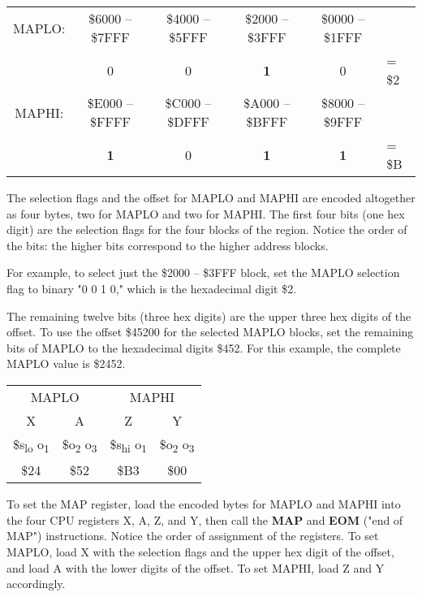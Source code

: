 \begin{center}
\begin{tabular}{c|c|c|c|c|l}
MAPLO: & \$6000 -- \$7FFF & \$4000 -- \$5FFF & \$2000 -- \$3FFF & \$0000 --
\$1FFF & \\
& 0 & 0 & {\bf 1} & 0 & = \$2 \\
\hline
MAPHI: & \$E000 -- \$FFFF & \$C000 -- \$DFFF & \$A000 -- \$BFFF & \$8000 --
\$9FFF & \\
& {\bf 1} & 0 & {\bf 1} & {\bf 1} & = \$B \\
\end{tabular}
\end{center}

The selection flags and the offset for MAPLO and MAPHI are encoded altogether
as four bytes, two for MAPLO and two for MAPHI. The first four bits (one hex
digit) are the selection flags for the four blocks of the region. Notice the
order of the bits: the higher bits correspond to the higher address blocks.

For example, to select just the \$2000 -- \$3FFF block, set the MAPLO selection
flag to binary "0 0 1 0," which is the hexadecimal digit \$2.

The remaining twelve bits (three hex digits) are the upper three hex digits of the
offset. To use the offset \$45200 for the selected MAPLO blocks, set the
remaining bits of MAPLO to the hexadecimal digits \$452. For this example, the
complete MAPLO value is \$2452.

\begin{center}
\begin{tabular}{cc|cc}
\multicolumn{2}{c}{MAPLO} & \multicolumn{2}{c}{MAPHI} \\
X & A & Z & Y \\
\hline
\$s\textsubscript{lo} o\textsubscript{1} &
\$o\textsubscript{2} o\textsubscript{3} &
\$s\textsubscript{hi} o\textsubscript{1} &
\$o\textsubscript{2} o\textsubscript{3} \\
\hline
\$24 & \$52 & \$B3 & \$00 \\
\end{tabular}
\end{center}

To set the MAP register, load the encoded bytes for MAPLO and MAPHI into the four CPU
registers X, A, Z, and Y, then call the {\bf MAP} and {\bf EOM} ("end of MAP")
instructions. Notice the order of assignment of the registers. To set MAPLO, load X
with the selection flags and the upper hex digit of the offset, and load A with the lower
digits of the offset. To set MAPHI, load Z and Y accordingly.


